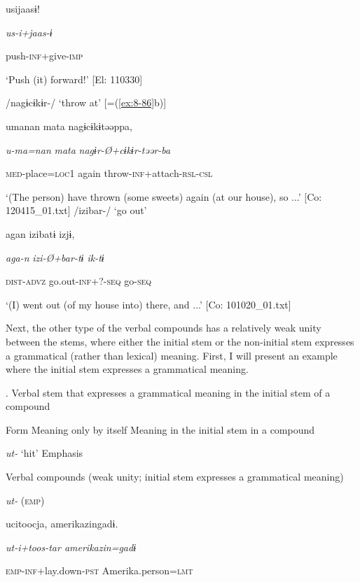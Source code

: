     {\TM}
\glll  usijaasɨ!

      \textit{us-i+jaas{}-ɨ}

      push-\textsc{inf}+give-\textsc{imp}

\glt ‘Push (it) forward!’ [El: 110330]

\ex /nagɨcɨkɨr-/ ‘throw at’ [=(\ref{ex:8-86}b)]

    {\TM}
\glll  umanan  mata  nagɨcɨkɨtəəppa,

      \textit{u-ma=nan}  \textit{mata}  \textit{nagɨr-Ø+cɨkɨr{}-təər-ba}

      \textsc{med}-place=\textsc{loc}1  again  throw-\textsc{inf}+attach-\textsc{rsl}-\textsc{csl}

\glt ‘(The person) have thrown (some sweets) again (at our house), so ...’ [Co: 120415\_01.txt]
\ex /izibar-/ ‘go out’

    {\TM}
\glll  agan  izibatɨ  izjɨ,

      \textit{aga-n}  \textit{izi-Ø+bar{}-tɨ  ik-tɨ}

      \textsc{dist}-\textsc{advz}  go.out-\textsc{inf}+?-\textsc{seq}  go-\textsc{seq}

\glt ‘(I) went out (of my house into) there, and ...’ [Co: 101020\_01.txt]
\z

  Next, the other type of the verbal compounds has a relatively weak unity between the stems, where either the initial stem or the non-initial stem expresses a grammatical (rather than lexical) meaning. First, I will present an example where the initial stem expresses a grammatical meaning.

\begin{table}
\caption{\label{tab:key:86}. Verbal stem that expresses a grammatical meaning in the initial stem of a compound}

Form    Meaning only by itself    Meaning in the initial stem in a compound

\textit{ut-}    ‘hit’    Emphasis
\end{table}

\ea\label{ex:8-147}
  Verbal compounds (weak unity; initial stem expresses a grammatical meaning)

\ea \textit{ut-} (\textsc{emp})

    {\TM}
\glll  ucitoocja,  {\textbar}amerikazin{\textbar}gadɨ.

      \textit{ut{}-i+toos-tar  amerikazin=gadɨ}

      \textsc{emp}-\textsc{inf}+lay.down-\textsc{pst}  Amerika.person=\textsc{lmt}

